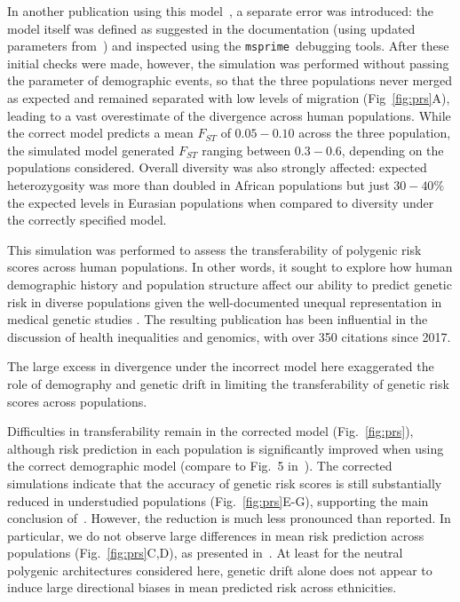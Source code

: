 \documentclass{article}
\newcommand{\msprime}[0]{\texttt{msprime}}
\begin{document}
In another publication using this model~\citep{martin2017human},
a separate error was introduced: the model itself was defined as suggested
in the documentation (using updated parameters
from~\citet{gravel2011demographic}) and inspected
using the \msprime\ debugging tools.
After these initial checks were made, however, the simulation
was performed without passing the parameter of demographic events,
so that the three populations
never merged as expected and remained separated with low levels of migration   (Fig~\ref{fig:prs}A),
leading to a vast overestimate of the divergence across human populations.
While the correct model predicts a mean $F_{ST}$ of
$0.05 - 0.10$ across the three population, the simulated model generated $F_{ST}$
ranging between $0.3 - 0.6$, depending on the populations considered.
Overall diversity was also strongly affected: expected heterozygosity was more than
doubled in African populations but just $30-40\%$ the expected
levels in Eurasian populations when compared to diversity under the correctly specified model.

This simulation was performed to assess the
transferability of polygenic risk scores across human populations. In other words, it sought to
explore how human demographic history and population structure affect our ability
to predict genetic risk in diverse populations given the well-documented unequal representation
in medical genetic studies \cite{Popejoy}. The resulting publication has been influential in the discussion of
health inequalities and genomics, with over 350 citations since 2017.



The large excess in divergence under the incorrect model here exaggerated the role of demography
and genetic drift in limiting the transferability of genetic risk scores across populations.

Difficulties in transferability remain in the corrected model (Fig.~\ref{fig:prs}), although
risk prediction in each population is significantly improved when using the correct
demographic model (compare to Fig.~5 in~\citet{martin2017human}).
The corrected simulations indicate that the accuracy of genetic risk scores is still
substantially reduced in understudied populations (Fig.~\ref{fig:prs}E-G),
supporting the main conclusion of~\citet{martin2017human}.
However, the reduction is much less pronounced than reported.
In particular, we do not observe large differences in mean risk prediction
across populations (Fig.~\ref{fig:prs}C,D), as presented in~\citet{martin2017human}.
At least for the neutral polygenic architectures considered here, genetic drift alone
does not appear to induce large directional biases in mean predicted risk across ethnicities.
\end{document}
